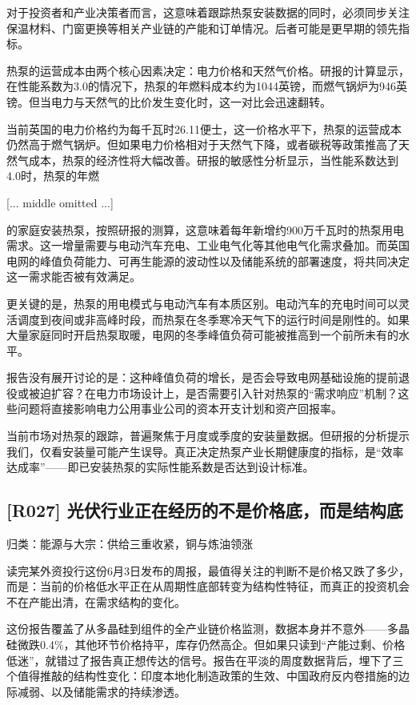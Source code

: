 \documentclass[11pt]{ctexart}
\begin{document}
对于投资者和产业决策者而言，这意味着跟踪热泵安装数据的同时，必须同步关注保温材料、门窗更换等相关产业链的产能和订单情况。后者可能是更早期的领先指标。

热泵的运营成本由两个核心因素决定：电力价格和天然气价格。研报的计算显示，在性能系数为3.0的情况下，热泵的年燃料成本约为1044英镑，而燃气锅炉为946英镑。但当电力与天然气的比价发生变化时，这一对比会迅速翻转。

当前英国的电力价格约为每千瓦时26.11便士，这一价格水平下，热泵的运营成本仍然高于燃气锅炉。但如果电力价格相对于天然气下降，或者碳税等政策推高了天然气成本，热泵的经济性将大幅改善。研报的敏感性分析显示，当性能系数达到4.0时，热泵的年燃

[... middle omitted ...]

的家庭安装热泵，按照研报的测算，这意味着每年新增约900万千瓦时的热泵用电需求。这一增量需要与电动汽车充电、工业电气化等其他电气化需求叠加。而英国电网的峰值负荷能力、可再生能源的波动性以及储能系统的部署速度，将共同决定这一需求能否被有效满足。

更关键的是，热泵的用电模式与电动汽车有本质区别。电动汽车的充电时间可以灵活调度到夜间或非高峰时段，而热泵在冬季寒冷天气下的运行时间是刚性的。如果大量家庭同时开启热泵取暖，电网的冬季峰值负荷可能被推高到一个前所未有的水平。

报告没有展开讨论的是：这种峰值负荷的增长，是否会导致电网基础设施的提前退役或被迫扩容？在电力市场设计上，是否需要引入针对热泵的“需求响应”机制？这些问题将直接影响电力公用事业公司的资本开支计划和资产回报率。

当前市场对热泵的跟踪，普遍聚焦于月度或季度的安装量数据。但研报的分析提示我们，仅看安装量可能产生误导。真正决定热泵产业长期健康度的指标，是“效率达成率”——即已安装热泵的实际性能系数是否达到设计标准。

\subsection{[R027] 光伏行业正在经历的不是价格底，而是结构底}
{\small\color{refgray}归类：能源与大宗：供给三重收紧，铜与炼油领涨}

读完某外资投行这份6月3日发布的周报，最值得关注的判断不是价格又跌了多少，而是：当前的价格低水平正在从周期性底部转变为结构性特征，而真正的投资机会不在产能出清，在需求结构的变化。

这份报告覆盖了从多晶硅到组件的全产业链价格监测，数据本身并不意外——多晶硅微跌0.4\%，其他环节价格持平，库存仍然高企。但如果只读到“产能过剩、价格低迷”，就错过了报告真正想传达的信号。报告在平淡的周度数据背后，埋下了三个值得推敲的结构性变化：印度本地化制造政策的生效、中国政府反内卷措施的边际减弱、以及储能需求的持续渗透。
\end{document}
